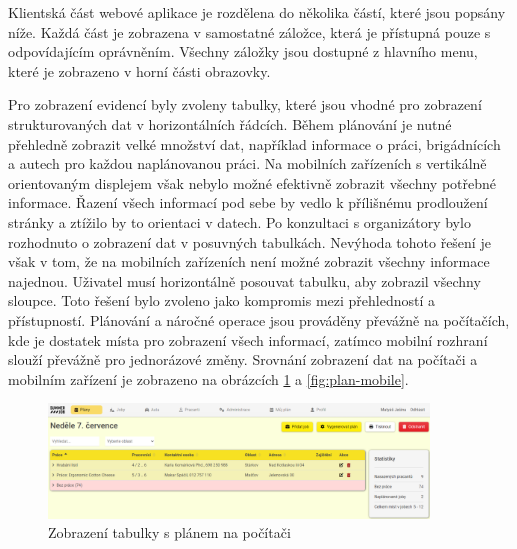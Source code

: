 Klientská část webové aplikace je rozdělena do několika částí, které jsou popsány níže. Každá část je zobrazena v samostatné záložce, která je přístupná
pouze s odpovídajícím oprávněním. Všechny záložky jsou dostupné z hlavního menu, které je zobrazeno v horní části obrazovky.

Pro zobrazení evidencí byly zvoleny tabulky, které jsou vhodné pro zobrazení strukturovaných dat v horizontálních řádcích.
Během plánování je nutné přehledně zobrazit velké množství dat, například informace o práci, brigádnících a autech pro každou naplánovanou práci.
Na mobilních zařízeních s vertikálně orientovaným displejem však nebylo možné efektivně zobrazit všechny potřebné informace.
Řazení všech informací pod sebe by vedlo k přílišnému prodloužení stránky a ztížilo by to orientaci v datech. Po konzultaci s organizátory
bylo rozhodnuto o zobrazení dat v posuvných tabulkách. Nevýhoda tohoto řešení je však v tom, že na mobilních zařízeních není možné zobrazit všechny
informace najednou. Uživatel musí horizontálně posouvat tabulku, aby zobrazil všechny sloupce. Toto řešení bylo zvoleno jako kompromis mezi
přehledností a přístupností. Plánování a náročné operace jsou prováděny převážně na počítačích, kde je dostatek místa pro zobrazení všech informací,
zatímco mobilní rozhraní slouží převážně pro jednorázové změny. Srovnání zobrazení dat na počítači a mobilním zařízení je zobrazeno na obrázcích \ref{fig:plan-pc} a \ref{fig:plan-mobile}.

\begin{figure}[ht]
    \centering
    \includegraphics[width=0.9\textwidth]{chapters/images/plan-pc.pdf}
    \caption{Zobrazení tabulky s plánem na počítači}
    \label{fig:plan-pc}
\end{figure}

